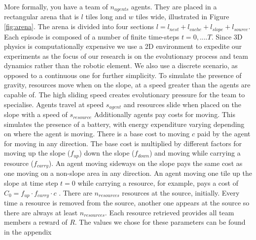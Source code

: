 \documentclass[12pt]{article}
\begin{document}
More formally, you have a team of $n_{agents}$ agents. 
They are placed in a rectangular arena that is $l$ tiles long and $w$ tiles wide, illustrated in Figure \ref{fig:arena}. 
The arena is divided into four sections $l= l_{nest} + l_{cache} + l_{slope} + l_{source}$.
Each episode is composed of a number of finite time-steps $t=0, .... T$. 
Since 3D physics is computationally expensive we use a 2D environment to expedite our experiments as the focus of our research is on the evolutionary process and team dynamics rather than the robotic element.
We also use a discrete scenario, as opposed to a continuous one for further simplicity.
To simulate the presence of gravity, resources move when on the slope, at a speed greater than the agents are capable of.
The high sliding speed creates evolutionary pressure for the team to specialise.
Agents travel at speed $s_{agent}$ and resources slide when placed on the slope with a speed of $s_{resource}$ 
Additionally agents pay costs for moving.
This simulates the presence of a battery, with energy expenditure varying depending on where the agent is moving.
There is a base cost to moving $c$ paid by the agent for moving in any direction.
The base cost is multiplied by different factors for moving up the slope ($f_{up}$) down the slope ($f_{down}$) and moving while carrying a resource ($f_{carry}$). 
An agent moving sideways on the slope pays the same cost as one moving on a non-slope area in any direction.
An agent moving one tile up the slope at time step $t=0$ while carrying a resource, for example, pays a cost of $C_{0} = f_{up} \cdot f_{carry} \cdot c$ .
There are $n_{resources}$ resources at the source, initially.
Every time a resource is removed from the source, another one appears at the source so there are always at least $n_{resources}$.
Each resource retrieved provides all team members a reward of $R$.
The values we chose for these parameters can be found in the appendix\\
\end{document}
